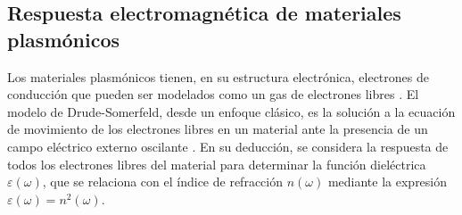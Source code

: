 \documentclass[letterpaper,11pt] {article}
\begin{document}
	\subsection{Respuesta electromagnética de materiales plasmónicos}
	
Los materiales plasmónicos tienen, en su estructura electrónica,  electrones de conducción que pueden ser modelados como un gas de electrones libres \cite{novotny2006principles}.  El modelo de Drude-Somerfeld, desde un enfoque clásico, es la solución a la ecuación de movimiento de los electrones libres en un material ante la presencia de un campo eléctrico externo oscilante \cite{gross2014festkorperphysik}.  En su deducción, se considera la respuesta de todos los electrones libres del material para determinar la función dieléctrica $\varepsilon(\omega)$, que se relaciona con el índice de refracción $n(\omega)$ mediante la expresión $\varepsilon(\omega) = n^2(\omega)$. 
\end{document}
